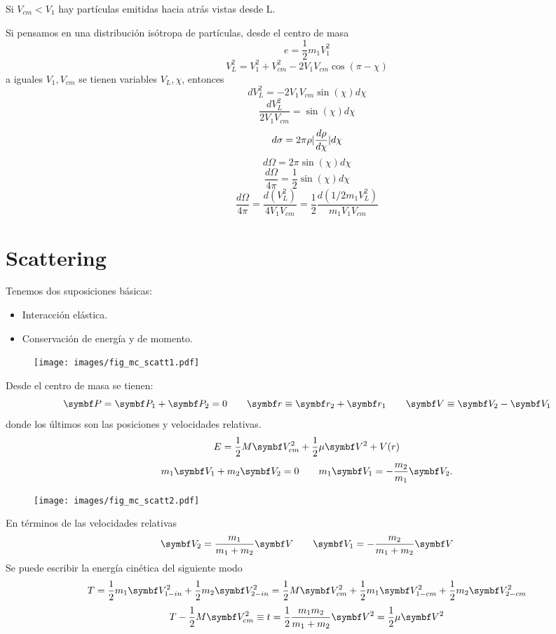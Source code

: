 \documentclass[10pt,oneside]{CBFT_book}
\begin{document}
Si $ V_{cm} < V_1$ hay partículas emitidas hacia atrás vistas desde L.

Si pensamos en una distribución isótropa de partículas, desde el centro de masa
\[
	e = \frac{1}{2} m_1 V_{1}^2
\]
\[
	V_L^2 = V_1^2 + V_{cm}^2 - 2 V_1 V_{cm} \cos( \pi -\chi )
\]
a iguales $V_1,V_{cm}$ se tienen variables $V_L, \chi$, entonces
\[
	dV_L^2 = - 2 V_1 V_{cm} \sin(\chi) d\chi
\]
\[
	\frac{dV_L^2}{2 V_1 V_{cm}} = \sin( \chi) d\chi 
\]
\[
	d\sigma = 2 \pi \rho |\frac{d^{\hspace{-0.05em}} {\rho}}{d {\chi}^{\hspace{-0.05em}}}| d\chi 
\]
\[
	d\Omega = 2 \pi \sin( \chi ) d\chi 
\]
\[
	\frac{d\Omega}{4\pi} = \frac{1}{2} \sin( \chi ) d\chi 
\]
\[
	\frac{d\Omega}{4\pi} =  \frac{d (V_L^2) }{4 V_1 V_{cm}} = \frac{1}{2} \frac{d ( 1/2 m_1 V_L^2) }{m_1 V_1 V_{cm}} 
\]

\section{Scattering}

Tenemos dos suposiciones básicas:
	\begin{itemize}
		\item Interacción elástica.
		\item Conservación de energía y de momento.
	\end{itemize}

\begin{figure}[htb]
	\begin{center}
	\texttt{[image: images/fig\_mc\_scatt1.pdf]}	 
	\end{center}
	\caption{}
\end{figure} 	
	
Desde el centro de masa se tienen:
\[
	\vb{P} = \vb{P}_1 + \vb{P}_2 = 0	\qquad		\vb{r} \equiv \vb{r}_2 + \vb{r}_1
	\qquad		\vb{V} \equiv \vb{V}_2 - \vb{V}_1
\]
donde los últimos son las posiciones y velocidades relativas.
\[
	E = \frac{1}{2} M \vb{V}_{cm}^2 + \frac{1}{2} \mu \vb{V}^2 + V(r)
\]
\[
	m_1 \vb{V}_1 + m_2 \vb{V}_2 = 0 \qquad m_1 \vb{V}_1 = -\frac{m_2}{m_1} \vb{V}_2.
\]
\begin{figure}[htb]
	\begin{center}
	\texttt{[image: images/fig\_mc\_scatt2.pdf]}	 
	\end{center}
	\caption{}
\end{figure} 
En términos de las velocidades relativas
\[
	\vb{V}_2 = \frac{m_1}{m_1 + m_2} \vb{V} \qquad \vb{V}_1 = -\frac{m_2}{m_1 + m_2} \vb{V}
\]
Se puede escribir la energía cinética del siguiente modo
\[
	T = \frac{1}{2} m_1 \vb{V}_{1-in}^2 + \frac{1}{2} m_2 \vb{V}_{2-in}^2 =
	\frac{1}{2} M \vb{V}_{cm}^2 + \frac{1}{2} m_1 \vb{V}_{1-cm}^2 + \frac{1}{2} m_2 \vb{V}_{2-cm}^2 
\]
\[
	T - \frac{1}{2} M \vb{V}_{cm}^2 \equiv t = \frac{1}{2} \frac{m_1 m_2}{m_1 + m_2} \vb{V}^2 =
							\frac{1}{2} \mu \vb{V}^2
\]
\end{document}
